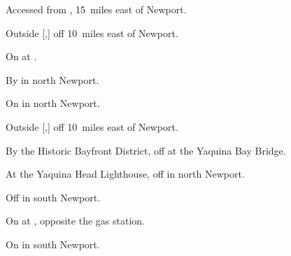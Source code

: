 

\begin{LocationList}

Accessed from , 15~miles east of Newport.

Outside [,] off  10~miles east of Newport.

\Location{\GasStation \Gas}
On  at .

By  in north Newport.

On  in north Newport.

Outside [,] off  10~miles east of Newport.

By the Historic Bayfront District, off  at the Yaquina Bay Bridge.

\Location{\RestArea \Rest}
At the Yaquina Head Lighthouse, off  in north Newport.

Off  in south Newport.

On  at , opposite the gas station.

\Location{\TruckService \Service}
On  in south Newport.

\end{LocationList}
